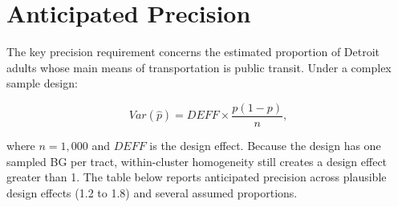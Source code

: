 \documentclass[
  11pt,
  letterpaper,
  DIV=11,
  numbers=noendperiod]{scrartcl}
\begin{document}
\begin{table}[!h]
\centering
\caption{\label{tab:expected-by-domain}Persons Selected and Expected Completed Interviews by Age Group}
\centering
{}
\end{table}

\section{Anticipated Precision}\label{anticipated-precision}

The key precision requirement concerns the estimated proportion of
Detroit adults whose main means of transportation is public transit.
Under a complex sample design:

\[
Var(\hat{p}) = DEFF \times \frac{p(1-p)}{n},
\]

where \(n = 1{,}000\) and \(DEFF\) is the design effect. Because the
design has one sampled BG per tract, within-cluster homogeneity still
creates a design effect greater than 1. The table below reports
anticipated precision across plausible design effects (1.2 to 1.8) and
several assumed proportions.
\end{document}
